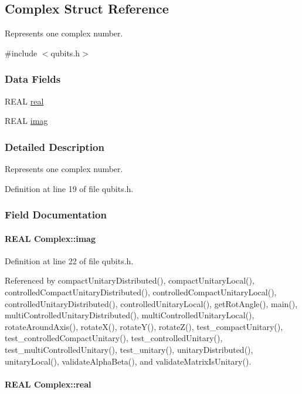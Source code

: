\hypertarget{structComplex}{
\subsection{Complex Struct Reference}
\label{structComplex}
}


Represents one complex number.  


{\ttfamily \#include $<$qubits.h$>$}\subsubsection*{Data Fields}
\begin{DoxyCompactItemize}
\item 
REAL \hyperlink{structComplex_a479ad939835457595fcca3ca55c06283}{real}
\item 
REAL \hyperlink{structComplex_a1151948284b21c0052f203f23ab931d9}{imag}
\end{DoxyCompactItemize}


\subsubsection{Detailed Description}
Represents one complex number. 

Definition at line 19 of file qubits.h.

\subsubsection{Field Documentation}
\hypertarget{structComplex_a1151948284b21c0052f203f23ab931d9}{
\paragraph[{imag}]{\setlength{\rightskip}{0pt plus 5cm}REAL {\bf Complex::imag}}\hfill}
\label{structComplex_a1151948284b21c0052f203f23ab931d9}


Definition at line 22 of file qubits.h.

Referenced by compactUnitaryDistributed(), compactUnitaryLocal(), controlledCompactUnitaryDistributed(), controlledCompactUnitaryLocal(), controlledUnitaryDistributed(), controlledUnitaryLocal(), getRotAngle(), main(), multiControlledUnitaryDistributed(), multiControlledUnitaryLocal(), rotateAroundAxis(), rotateX(), rotateY(), rotateZ(), test\_\-compactUnitary(), test\_\-controlledCompactUnitary(), test\_\-controlledUnitary(), test\_\-multiControlledUnitary(), test\_\-unitary(), unitaryDistributed(), unitaryLocal(), validateAlphaBeta(), and validateMatrixIsUnitary().\hypertarget{structComplex_a479ad939835457595fcca3ca55c06283}{
\paragraph[{real}]{\setlength{\rightskip}{0pt plus 5cm}REAL {\bf Complex::real}}\hfill}
\label{structComplex_a479ad939835457595fcca3ca55c06283}


